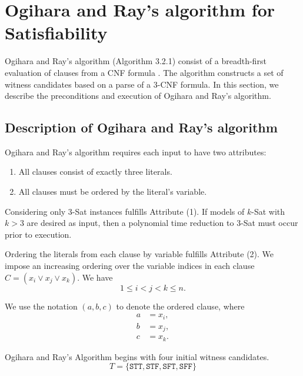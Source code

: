 
\section{Ogihara and Ray's algorithm for {\sc Satisfiability}}


Ogihara and Ray's algorithm (Algorithm 3.2.1) consist of a breadth-first evaluation of clauses from a CNF formula \cite{Ogihara:1996:BFS:898228,Ogihara97dna-basedparallel}.  The algorithm constructs a set of witness candidates based on a parse of a 3-CNF formula.  In this section, we describe the preconditions and execution of Ogihara and Ray's algorithm.


\FloatBarrier

\subsection{Description of Ogihara and Ray's algorithm}
		
Ogihara and Ray's algorithm requires each input to have two attributes:

\begin{enumerate}
\item All clauses consist of exactly three literals.
\item All clauses must be ordered by the literal's variable.
\end{enumerate}

Considering only $3$-{\sc Sat} instances fulfills Attribute (1).  If models of $k$-{\sc Sat} with $k > 3$ are desired as input, then a polynomial time reduction to $3$-{\sc Sat} must occur prior to execution.

Ordering the literals from each clause by variable fulfills Attribute (2).  We impose an increasing ordering over the variable indices in each clause $C = (x_i \vee x_j \vee x_k)$.  We have
\[
1 \leq i < j < k \leq n.
\]

\noindent We use the notation $(a, b, c)$ to denote the ordered clause, where
\begin{align*}
a &= x_i, \\
b &= x_j, \\
c &= x_k.
\end{align*}

{\sc Ogihara and Ray's Algorithm} begins with four initial witness candidates. 
\[
T = \{ \texttt{STT}, \texttt{STF}, \texttt{SFT}, \texttt{SFF}\}
\]

